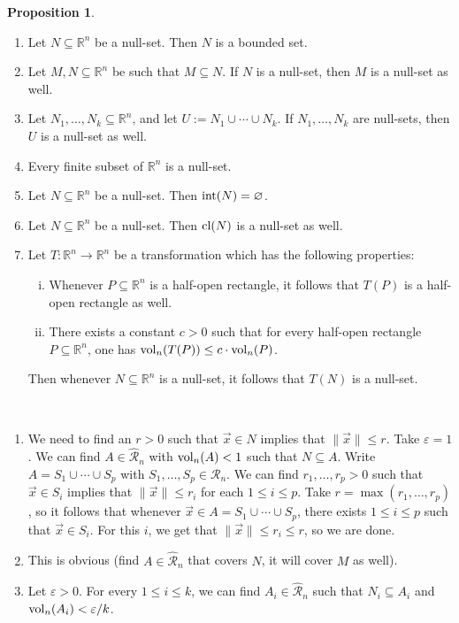 \documentclass[11pt]{article}
\makeatletter
\theoremstyle{definition}
\newtheorem{prop}[thm]{Proposition}
\newcommand{\R}{\ensuremath{\mathbb{R}}}
\newenvironment{pf}[1][\proofname]{\par
  \pushQED{\qed}%
  \normalfont \topsep0\p@\relax
  \trivlist
  \item[\hskip\labelsep\itshape
  #1\@addpunct{.}]\ignorespaces
}{%
  \popQED\endtrivlist\@endpefalse
}
\makeatother
\begin{document}
\begin{prop}~\vspace{-1.5ex}
\begin{enumerate}[(1)]
\item Let $N \subseteq \R^n$ be a null-set. Then $N$ is a bounded set.
\item Let $M, N \subseteq \R^n$ be such that $M \subseteq N$. If $N$ is a null-set, then $M$ is a null-set as well.
\item Let $N_1, \dots, N_k \subseteq \R^n$, and let $U := N_1 \cup \cdots \cup N_k$. If $N_1, \dots, N_k$ are null-sets, then $U$ is a null-set as well.
\item Every finite subset of $\R^n$ is a null-set.
\item Let $N \subseteq \R^n$ be a null-set. Then ${\rm int}(N) = \varnothing$.
\item Let $N \subseteq \R^n$ be a null-set. Then ${\rm cl}(N)$ is a null-set as well.
\item Let $T : \R^n \to \R^n$ be a transformation which has the following properties:
\begin{enumerate}[(i)]
\item Whenever $P \subseteq \R^n$ is a half-open rectangle, it follows that $T(P)$ is a half-open rectangle as well.
\item There exists a constant $c > 0$ such that for every half-open rectangle $P \subseteq \R^n$, one has ${\rm vol}_n(T(P)) \leq c \cdot {\rm vol}_n(P)$. 
\end{enumerate}
Then whenever $N \subseteq \R^n$ is a null-set, it follows that $T(N)$ is a null-set.
\end{enumerate}
\begin{pf}~\vspace{-1.5ex}
\begin{enumerate}[(1)]
\item We need to find an $r > 0$ such that $\vec{x} \in N$ implies that $\|\vec{x}\| \leq r$. Take $\varepsilon = 1$. We can find $A \in \widehat{\mathcal{R}}_n$ with ${\rm vol}_n(A) < 1$ such that $N \subseteq A$. Write $A = S_1 \cup \cdots \cup S_p$ with $S_1, \dots, S_p \in \mathcal{R}_n$. We can find $r_1, \dots, r_p > 0$ such that $\vec{x} \in S_i$ implies that $\|\vec{x}\| \leq r_i$ for each $1 \leq i \leq p$. Take $r = \max(r_1, \dots, r_p)$, so it follows that whenever $\vec{x} \in A = S_1 \cup \cdots \cup S_p$, there exists $1 \leq i \leq p$ such that $\vec{x} \in S_i$. For this $i$, we get that $\|\vec{x}\| \leq r_i \leq r$, so we are done.
\item This is obvious (find $A \in \widehat{\mathcal{R}}_n$ that covers $N$, it will cover $M$ as well).
\item Let $\varepsilon > 0$. For every $1 \leq i \leq k$, we can find $A_i \in \widehat{\mathcal{R}}_n$ such that $N_i \subseteq A_i$ and ${\rm vol}_n(A_i) < \varepsilon / k$. 


\end{enumerate}
\end{pf}
\end{prop}
\end{document}
